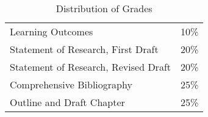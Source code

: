 \documentclass[titlepage]{article}
\newcommand\path{../../syllabus}
\begin{document}
\begin{table}[htbp]
  \centering
  \begin{tabular}{lr}
    \toprule
    Learning Outcomes & 10\% \\
    Statement of Research, First Draft & 20\% \\
    Statement of Research, Revised Draft & 20\% \\
    Comprehensive Bibliography & 25\% \\
    Outline and Draft Chapter & 25\% \\
    \bottomrule
  \end{tabular}
  \caption{Distribution of Grades}
  \label{distribution}
\end{table}
%
%
%
%
%
%
%
%
%
%
%
%
%
%
%
%
%
%
%
%
\end{document}
